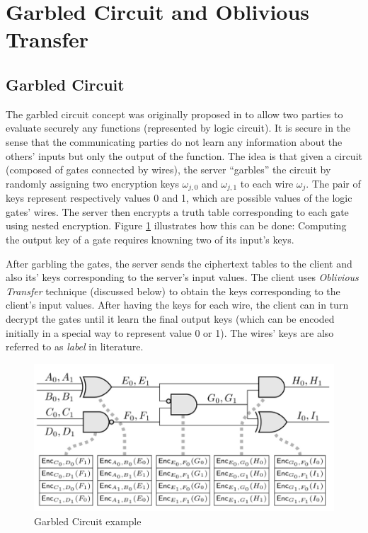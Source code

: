 \begin{description}
\begin{enumerate}
  \end{enumerate}
\end{description}

\section{Garbled Circuit and Oblivious Transfer}
\label{sec:defMPP}

\subsection{Garbled Circuit}
\label{sec:garbledCircuitPre}

The garbled circuit concept was originally proposed in \cite{yao1986generate} to
allow two parties to evaluate securely any functions (represented by logic
circuit). It is secure in the sense that the communicating parties do not learn
any information about the others' inputs but only the output of the
function. The idea is that given a circuit (composed of gates connected by
wires), the server ``garbles'' the circuit by randomly assigning two encryption
keys \(\omega_{j,0}\) and \(\omega_{j,1}\) to each wire \(\omega_{j}\). The pair
of keys represent respectively values 0 and 1, which are possible values of the
logic gates' wires. The server then encrypts a truth table corresponding to each
gate using nested encryption. Figure \ref{fig:garbledCircuit} illustrates how
this can be done: Computing the output key of a gate requires knowning two of
its input's keys.

After garbling the gates, the server sends the ciphertext tables to the client
and also its' keys corresponding to the server's input values. The client uses
\textit{Oblivious Transfer } technique (discussed below) to obtain the keys
corresponding to the client's input values. After having the keys for each wire,
the client can in turn decrypt the gates until it learn the final output keys
(which can be encoded initially in a special way to represent value 0 or 1). The
wires' keys are also referred to as \textit{label} in literature.

\begin{figure}[htbp!] 
  \centering    
  \includegraphics[width=1.0\textwidth]{Chapter2/Figs/Raster/garbledCircuit}
  \caption{Garbled Circuit example}
  \label{fig:garbledCircuit}
\end{figure}


